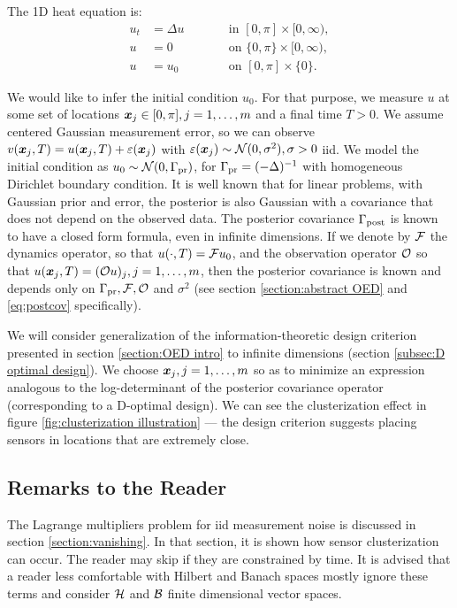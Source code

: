 \documentclass{amsart}
\numberwithin{equation}{section}
\begin{document}
The 1D heat equation is:
\begin{subequations}\label{eq:heat equation}
  \begin{alignat}{2}
    u_t &= \Delta u &&\qquad \text{in } [0,\pi] \times [0,\infty),\\
      u &= 0 &&\qquad \text{on } \{0, \pi\} \times [0,\infty),\\
        u &= u_0 &&\qquad \text{on }[0,\pi] \times \{0\}.
  \end{alignat}
\end{subequations}

We would like to infer the initial condition $u_0$. For that purpose,
we measure $u$ at some set of locations ${\boldsymbol{x}}_j \in [0,\pi], j=1, \dots,m$
and a final time $T > 0$. We assume centered Gaussian measurement
error, so we can observe $v({\boldsymbol{x}}_j,T) = u({\boldsymbol{x}}_j,T) + \varepsilon({\boldsymbol{x}}_j)$ with
$\varepsilon({\boldsymbol{x}}_j) \sim \mathcal{N}(0, \sigma^2), \sigma > 0$ iid. We model the
initial condition as $u_0 \sim \mathcal{N}(0,\Gamma_{\textup{pr}})$, for $\Gamma_{\textup{pr}} =
(-\Delta)^{-1}$ with  homogeneous Dirichlet boundary condition. It is
well known \cite{Tarantola05} that for linear problems, with Gaussian
prior and error, the posterior is also Gaussian with a covariance that
does not depend on the observed data. The posterior covariance
$\Gamma_{\textup{post}}$ is known to have a closed form formula, even in infinite
dimensions\cite{Stuart10}. If we denote by $\mathcal{F}$ the dynamics
operator, so that $u( \cdot,T) = \mathcal{F} u_0$, and the observation
operator $\mathcal{O}$ so that $u({\boldsymbol{x}}_j,T) = (\mathcal{O} u)_j, j=1,\dots,m$, then the
posterior covariance is known and depends only on $\Gamma_{\textup{pr}}, \mathcal{F}, \mathcal{O}$ and
$\sigma^2$ (see section \ref{section:abstract OED} and
\eqref{eq:postcov} specifically).

We will consider generalization of the information-theoretic design
criterion presented in section \ref{section:OED intro} to infinite
dimensions (section \ref{subsec:D optimal design}). We choose
${\boldsymbol{x}}_j,j=1,\dots,m$ so as to minimize an expression analogous to the
log-determinant of the posterior covariance operator (corresponding to
a D-optimal design). We can see the clusterization effect in figure
\ref{fig:clusterization illustration} --- the design criterion
suggests placing sensors in locations that are extremely close.


\subsection{Remarks to the Reader}\label{subsec:plan}
The Lagrange multipliers problem for iid measurement noise is
discussed in section \ref{section:vanishing}. In that section, it is
shown how sensor clusterization can occur. The reader may skip if they
are constrained by time. It is advised that a reader less comfortable
with Hilbert and Banach spaces mostly ignore these terms and consider
$\mathcal{H}$ and $\mathcal{B}$ finite dimensional vector spaces.
\end{document}

